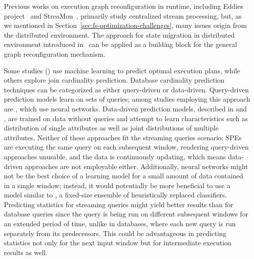Previous works on execution graph reconfiguration in runtime, including Eddies project~\cite{10.1145/335191.335420} and StreaMon~\cite{10.1145/1007568.1007702}, primarily study centralized stream processing, but, as we mentioned in Section~\ref{sec:fs-optimization-challenges}, many issues origin from the distributed environment. The approach for state migration in distributed environment introduced in~\cite{10.14778/3329772.3329777} can be applied as a building block for the general graph reconfiguration mechanism.

Some studies (\cite{krishnan2018learning, marcus2019neo}) use machine learning to predict optimal execution plans, while others explore join cardinality prediction. Database cardinality prediction techniques can be categorized as either query-driven or data-driven. Query-driven prediction models learn on sets of queries; among studies employing this approach are \cite{liu2015cardinality, CHEN20211047, kipf2018learned, ortiz2019empirical}, which use neural networks. Data-driven prediction models, described in \cite{hilprecht2020deepdb} and \cite{yang2020neurocard}, are trained on data without queries and attempt to learn characteristics such as distribution of single attributes as well as joint distributions of multiple attributes. Neither of these approaches fit the streaming queries scenario: SPEs are executing the same query on each subsequent window, rendering query-driven approaches unusable, and the data is continuously updating, which means data-driven approaches are not employable either. Additionally, neural networks might not be the best choice of a learning model for a small amount of data contained in a single window; instead, it would potentially be more beneficial to use a model similar to \cite{street2001ensemble}, a fixed-size ensemble of heuristically replaced classifiers. Predicting statistics for streaming queries might yield better results than for database queries since the query is being run on different subsequent windows for an extended period of time, unlike in databases, where each new query is run separately from its predecessors. This could be advantageous in predicting statistics not only for the next input window but for intermediate execution results as well.




